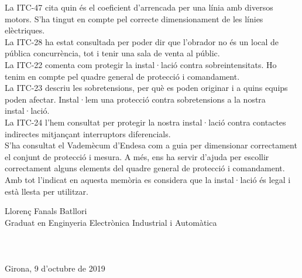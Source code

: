 \newline La ITC-47 cita quin és el coeficient d'arrencada per una línia amb diversos motors. S'ha tingut en compte pel correcte dimensionament de les línies elèctriques.\\
\newline La ITC-28 ha estat consultada per poder dir que l'obrador no és un local de pública concurrència, tot i tenir una sala de venta al públic.\\
\newline La ITC-22 comenta com protegir la instal·lació contra sobreintensitats. Ho tenim en compte pel quadre general de protecció i comandament.\\
\newline La ITC-23 descriu les sobretensions, per què es poden originar i a quins equips poden afectar. Instal·lem una protecció contra sobretensions a la nostra instal·lació.\\
\newline La ITC-24 l'hem consultat per protegir la nostra instal·lació contra contactes indirectes mitjançant interruptors diferencials.\\
\newline S'ha consultat el Vademècum d'Endesa com a guia per dimensionar correctament el conjunt de protecció i mesura. A més, ens ha servir d'ajuda per escollir correctament alguns elements del quadre general de protecció i comandament.\\
\newline Amb tot l'indicat en aquesta memòria es considera que la instal·lació és legal i està llesta per utilitzar.

\vspace*{\fill}
\noindent Llorenç Fanals Batllori\\
Graduat en Enginyeria Electrònica Industrial i Automàtica\\
\\
\\
\\
Girona, 9 d'octubre de 2019

\clearpage